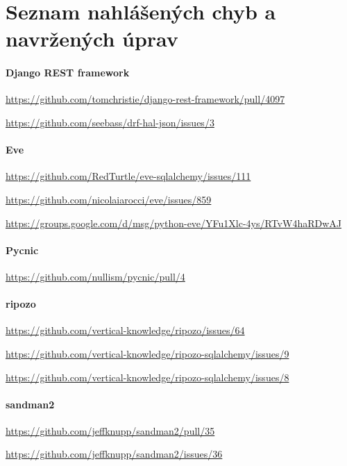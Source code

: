\chapter{Seznam nahlášených chyb a navržených úprav \label{issues}}

\subsubsection*{Django REST framework}\label{django-rest-framework}

\url{https://github.com/tomchristie/django-rest-framework/pull/4097}

\url{https://github.com/seebass/drf-hal-json/issues/3}

\subsubsection*{Eve}\label{eve}

\url{https://github.com/RedTurtle/eve-sqlalchemy/issues/111}

\url{https://github.com/nicolaiarocci/eve/issues/859}

\url{https://groups.google.com/d/msg/python-eve/YFu1Xlc-4ys/RTvW4haRDwAJ}

\subsubsection*{Pycnic}\label{pycnic}

\url{https://github.com/nullism/pycnic/pull/4}

\subsubsection*{ripozo}\label{ripozo}

\url{https://github.com/vertical-knowledge/ripozo/issues/64}

\url{https://github.com/vertical-knowledge/ripozo-sqlalchemy/issues/9}

\url{https://github.com/vertical-knowledge/ripozo-sqlalchemy/issues/8}

\subsubsection*{sandman2}\label{sandman2}

\url{https://github.com/jeffknupp/sandman2/pull/35}

\url{https://github.com/jeffknupp/sandman2/issues/36}

